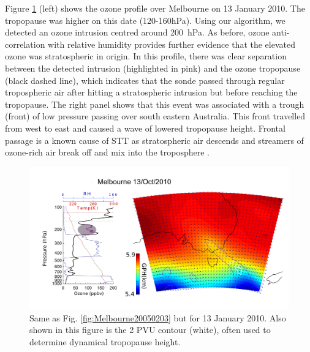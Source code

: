 \documentclass[acp, manuscript]{copernicus} %
\providecommand{\DIFadd}[1]{{\protect\color{blue}\uwave{#1}}} %
\providecommand{\DIFaddbegin}{} %
\providecommand{\DIFaddend}{} %
\begin{document}
    Figure \ref{fig:Melbourne20100113} (left) shows the ozone profile over Melbourne on 13 January 2010.
    The tropopause was higher on this date (120-160\DIFaddbegin \DIFadd{~}\DIFaddend hPa).
    Using our algorithm, we detected an ozone intrusion centred around 200~hPa.
    As before, ozone anti-correlation with relative humidity provides further evidence that the elevated ozone was stratospheric in origin.
    In this profile, there was clear separation between the detected intrusion (highlighted in pink) and the ozone tropopause (black dashed line), which indicates that the sonde passed through regular tropospheric air after hitting a stratospheric intrusion but before reaching the tropopause.
    The right panel shows that this event was associated with a trough (front) of low pressure passing over south eastern Australia.
    This front travelled from west to east and caused a wave of lowered tropopause height. 
    Frontal passage is a known cause of STT as stratospheric air descends and streamers of ozone-rich air break off and mix into the troposphere \citep{Sprenger2003}.

    \begin{figure}[t]
      \includegraphics[width=14.0cm]{figures/Melbourne20100113.png}
      \caption{Same as Fig. \ref{fig:Melbourne20050203} but for 13 January 2010.
	Also shown in this figure is the 2 PVU contour (white), often used to determine dynamical tropopause height.}
      \label{fig:Melbourne20100113}
    \end{figure}
\end{document}
